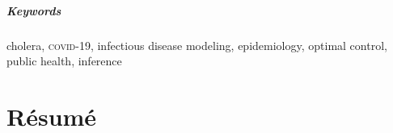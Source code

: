 \paragraph{Keywords} cholera, \textsc{covid}-19, infectious disease modeling,
epidemiology, optimal control, public health, inference
 
 
 \chapter*{Résumé} 
 

